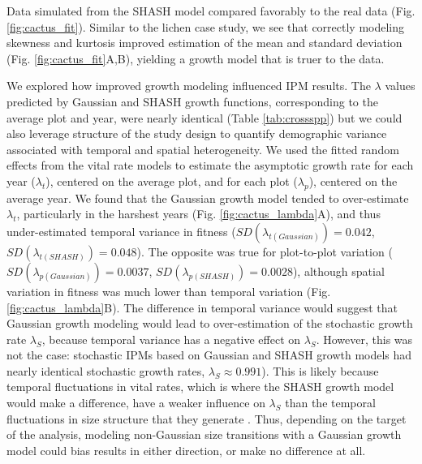 \documentclass[12pt]{article}
\begin{document}
Data simulated from the SHASH model compared favorably to the real data (Fig. \ref{fig:cactus_fit}). 
Similar to the lichen case study, we see that correctly modeling skewness and kurtosis improved estimation of the mean and standard deviation (Fig. \ref{fig:cactus_fit}A,B), yielding a growth model that is truer to the data. 

We explored how improved growth modeling influenced IPM results.
The $\lambda$ values predicted by Gaussian and SHASH growth functions, corresponding to the average plot and year, were nearly identical (Table \ref{tab:crossspp}) but we could also leverage structure of the study design to quantify demographic variance associated with temporal and spatial heterogeneity.
We used the fitted random effects from the vital rate models to estimate the asymptotic growth rate for each year ($\lambda_t$), centered on the average plot, and for each plot ($\lambda_p$), centered on the average year.
We found that the Gaussian growth model tended to over-estimate $\lambda_t$, particularly in the harshest years (Fig. \ref{fig:cactus_lambda}A), and thus under-estimated temporal variance in fitness ($SD(\lambda_{t(Gaussian)})=0.042$, $SD(\lambda_{t(SHASH)})=0.048$). 
The opposite was true for plot-to-plot variation ($SD(\lambda_{p(Gaussian)})=0.0037$, $SD(\lambda_{p(SHASH)})=0.0028$), although spatial variation in fitness was much lower than temporal variation (Fig. \ref{fig:cactus_lambda}B). 
The difference in temporal variance would suggest that Gaussian growth modeling would lead to over-estimation of the stochastic growth rate $\lambda_S$, because temporal variance has a negative effect on $\lambda_S$.
However, this was not the case: stochastic IPMs based on Gaussian and SHASH growth models had nearly identical stochastic growth rates, $\lambda_S \approx 0.991$).  
This is likely because temporal fluctuations in vital rates, which is where the SHASH growth model would make a difference, have a weaker influence on $\lambda_S$ than the temporal fluctuations in size structure that they generate \citep{ellis2013role,compagnoni2016effect}. 
Thus, depending on the target of the analysis, modeling non-Gaussian size transitions with a Gaussian growth model could bias results in either direction, or make no difference at all. 
\end{document}
